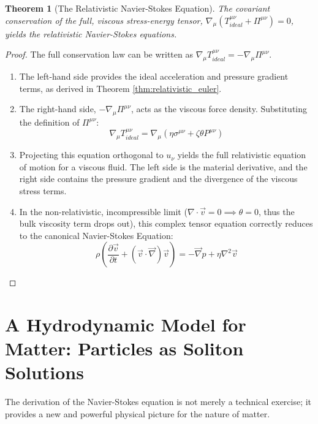 \documentclass[11pt, letterpaper]{report}
\theoremstyle{plain} %
\newtheorem{theorem}{Theorem}[chapter]
\theoremstyle{definition} %
\theoremstyle{remark} %
\begin{document}
\begin{theorem}[The Relativistic Navier-Stokes Equation]
The covariant conservation of the full, viscous stress-energy tensor, $\nabla_\mu (T^{\mu\nu}_{ideal} + \Pi^{\mu\nu}) = 0$, yields the relativistic Navier-Stokes equations.
\end{theorem}
\begin{proof}
The full conservation law can be written as $\nabla_\mu T^{\mu\nu}_{ideal} = -\nabla_\mu \Pi^{\mu\nu}$.
\begin{enumerate}
    \item The left-hand side provides the ideal acceleration and pressure gradient terms, as derived in Theorem \ref{thm:relativistic_euler}.
    \item The right-hand side, $-\nabla_\mu \Pi^{\mu\nu}$, acts as the viscous force density. Substituting the definition of $\Pi^{\mu\nu}$:
    $$ \nabla_\mu T^{\mu\nu}_{ideal} = \nabla_\mu (\eta \sigma^{\mu\nu} + \zeta \theta P^{\mu\nu}) $$
    \item Projecting this equation orthogonal to $u_\nu$ yields the full relativistic equation of motion for a viscous fluid. The left side is the material derivative, and the right side contains the pressure gradient and the divergence of the viscous stress terms.

    \item In the non-relativistic, incompressible limit ($\nabla \cdot \vec{v}=0 \implies \theta=0$, thus the bulk viscosity term drops out), this complex tensor equation correctly reduces to the canonical Navier-Stokes Equation:
    \begin{equation}
        \boxed{\rho \left( \frac{\partial \vec{v}}{\partial t} + (\vec{v}\cdot\vec{\nabla})\vec{v} \right) = -\vec{\nabla}p + \eta \nabla^2\vec{v}}
        \label{eq:navier_stokes_final}
    \end{equation}
\end{enumerate}
\end{proof}

\section{A Hydrodynamic Model for Matter: Particles as Soliton Solutions}
\label{sec:hydro_solitons}

The derivation of the Navier-Stokes equation is not merely a technical exercise; it provides a new and powerful physical picture for the nature of matter.
\end{document}
